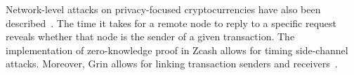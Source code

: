 Network-level attacks on privacy-focused cryptocurrencies have also been described~\cite{Tramer2020}.
The time it takes for a remote node to reply to a specific request reveals whether that node is the sender of a given transaction.
The implementation of zero-knowledge proof in Zcash allows for timing side-channel attacks.
Moreover, Grin allows for linking transaction senders and receivers~\cite{Bogatyy2019}.
